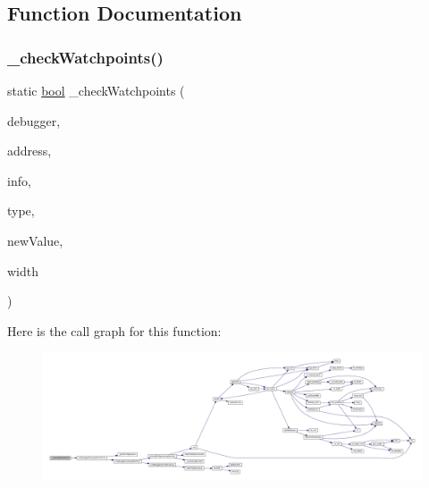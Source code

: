 \subsection{Function Documentation}
\mbox{\label{arm_2debugger_2memory-debugger_8c_af27e1b9541b0d441825fffdc4d3ad7fb}} 
\subsubsection{\texorpdfstring{\+\_\+check\+Watchpoints()}{\_checkWatchpoints()}}
{\footnotesize\ttfamily static \mbox{\hyperlink{libretro_8h_a4a26dcae73fb7e1528214a068aca317e}{bool}} \+\_\+check\+Watchpoints (\begin{DoxyParamCaption}\item[{struct A\+R\+M\+Debugger $\ast$}]{debugger,  }\item[{uint32\+\_\+t}]{address,  }\item[{struct m\+Debugger\+Entry\+Info $\ast$}]{info,  }\item[{enum m\+Watchpoint\+Type}]{type,  }\item[{uint32\+\_\+t}]{new\+Value,  }\item[{\mbox{\hyperlink{ioapi_8h_a787fa3cf048117ba7123753c1e74fcd6}{int}}}]{width }\end{DoxyParamCaption})\hspace{0.3cm}{\ttfamily [static]}}

Here is the call graph for this function\+:
\nopagebreak
\begin{figure}[H]
\begin{center}
\leavevmode
\includegraphics[width=350pt]{arm_2debugger_2memory-debugger_8c_af27e1b9541b0d441825fffdc4d3ad7fb_cgraph}
\end{center}
\end{figure}
\mbox{\label{arm_2debugger_2memory-debugger_8c_aca7f028f215a0ba438cbbeb1078619cc}} 
